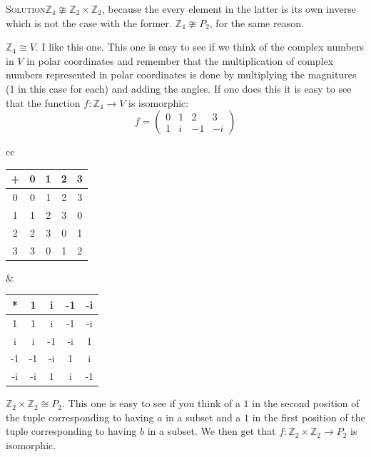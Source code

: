 \documentclass[twoside]{amsart}
\newcommand{\solution}{\textsc{Solution}\xspace}
\newcommand{\iso}{\cong}
\newcommand{\niso}{\ncong}
\newcommand{\blank}{\vspace{5pt}}
\begin{document}
\begin{enumerate}[A.]
\begin{enumerate}[1]
      \blank \noindent \solution $\mathbb{Z}_4 \niso \mathbb{Z}_2
      \times \mathbb{Z}_2$, because the every element in the latter
      is its own inverse which is not the case with the former. 
      $\mathbb{Z}_4 \niso P_2$, for the same reason.

      $\mathbb{Z}_4 \iso V$. I like this one. This one is easy to
      see if we think of the complex numbers in $V$ in polar
      coordinates and remember that the multiplication of 
      complex numbers represented in polar coordinates is done by
      multiplying the magnitures (1 in this case for each) and
      adding the angles. If one does this it is easy to see
      that the function $f : \mathbb{Z}_4 \to V$ is isomorphic:
      \[
         f = 
         \begin{pmatrix}
            0 & 1 & 2 & 3 \\
            1 & i & -1 & -i 
         \end{pmatrix}
      \]


      \begin{center}
         \begin{tabular}{cc}
            \begin{tabular}{c|cccc}
               + & 0 & 1 & 2 & 3 \\ \hline
               0 & 0 & 1 & 2 & 3 \\
               1 & 1 & 2 & 3 & 0 \\
               2 & 2 & 3 & 0 & 1 \\
               3 & 3 & 0 & 1 & 2
            \end{tabular} &
            \begin{tabular}{c|cccc}
               *  &  1 &  i & -1 & -i \\ \hline
               1  &  1 &  i & -1 & -i \\
               i  &  i & -1 & -i &  1 \\
               -1 & -1 & -i &  1 &  i \\
               -i & -i &  1 &  i & -1
            \end{tabular}
         \end{tabular}
      \end{center}
      \blank

      $\mathbb{Z}_2 \times \mathbb{Z}_2 \iso P_2$. This one is easy
      to see if you think of a $1$ in the second position of the
      tuple corresponding to having $a$ in a subset and a $1$ in the
      first position of the tuple corresponding to having $b$ in a
      subset. We then get that $f : \mathbb{Z}_2 \times \mathbb{Z}_2
      \to P_2$ is isomorphic.


\end{enumerate}
\end{enumerate}
\end{document}
